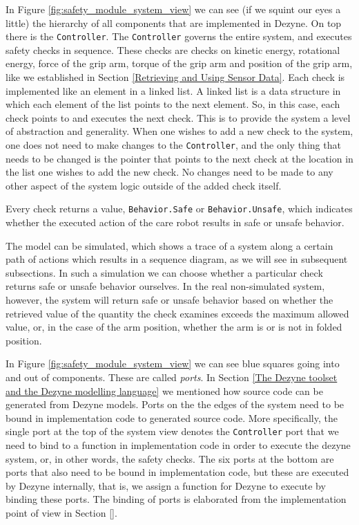 \documentclass[12pt]{scrreprt}
\begin{document}
In Figure \ref{fig:safety_module_system_view} we can see (if we squint our eyes a little) the hierarchy of all components that are implemented in Dezyne. On top there is the \texttt{Controller}. The \texttt{Controller} governs the entire system, and executes safety checks in sequence. These checks are checks on kinetic energy, rotational energy, force of the grip arm, torque of the grip arm and position of the grip arm, like we established in Section \ref{Retrieving and Using Sensor Data}. Each check is implemented like an element in a linked list. A linked list is a data structure in which each element of the list points to the next element. So, in this case, each check points to and executes the next check. This is to provide the system a level of abstraction and generality. When one wishes to add a new check to the system, one does not need to make changes to the \texttt{Controller}, and the only thing that needs to be changed is the pointer that points to the next check at the location in the list one wishes to add the new check. No changes need to be made to any other aspect of the system logic outside of the added check itself.
\par
Every check returns a value, \texttt{Behavior.Safe} or \texttt{Behavior.Unsafe}, which indicates whether the executed action of the care robot results in safe or unsafe behavior. 
\par
The model can be simulated, which shows a trace of a system along a certain path of actions which results in a sequence diagram, as we will see in subsequent subsections. In such a simulation we can choose whether a particular check returns safe or unsafe behavior ourselves. In the real non-simulated system, however, the system will return safe or unsafe behavior based on whether the retrieved value of the quantity the check examines exceeds the maximum allowed value, or, in the case of the arm position, whether the arm is or is not in folded position. 
\par
In Figure \ref{fig:safety_module_system_view} we can see blue squares going into and out of components. These are called \textit{ports}. In Section \ref{The Dezyne toolset and the Dezyne modelling language} we mentioned how source code can be generated from Dezyne models. Ports on the the edges of the system need to be bound in implementation code to generated source code. More specifically, the single port at the top of the system view denotes the \texttt{Controller} port that we need to bind to a function in implementation code in order to execute the dezyne system, or, in other words, the safety checks. The six ports at the bottom are ports that also need to be bound in implementation code, but these are executed by Dezyne internally, that is, we assign a function for Dezyne to execute by binding these ports. The binding of ports is elaborated from the implementation point of view in Section \ref{}.
\end{document}
